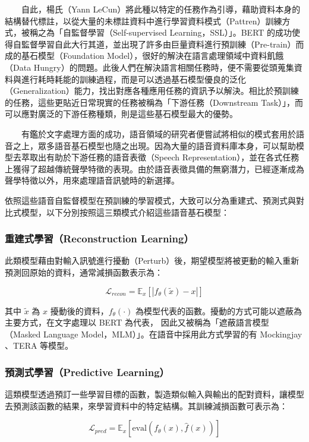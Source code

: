 　　自此，楊氏（Yann LeCun）將此種以特定的任務作為引導，藉助資料本身的結構替代標註，以從大量的未標註資料中進行學習資料模式（Pattren）訓練方式，被稱之為「自監督學習（Self-supervised Learning，SSL）」。BERT 的成功使得自監督學習自此大行其道，並出現了許多由巨量資料進行預訓練（Pre-train）而成的基石模型（Foundation Model），很好的解決在語言處理領域中資料飢餓（Data Hungry）的問題。此後人們在解決語言相關任務時，便不需要從頭蒐集資料與進行耗時耗能的訓練過程，而是可以透過基石模型優良的泛化（Generalization）能力，找出對應各種應用任務的資訊予以解決。相比於預訓練的任務，這些更貼近日常現實的任務被稱為「下游任務（Downstream Task）」，而可以應對廣泛的下游任務種類，則是這些基石模型最大的優勢。

　　有鑑於文字處理方面的成功，語音領域的研究者便嘗試將相似的模式套用於語音之上，眾多語音基石模型也隨之出現。因為大量的語音資料庫本身，可以幫助模型去萃取出有助於下游任務的語音表徵（Speech Representation），並在各式任務上獲得了超越傳統聲學特徵的表現。由於語音表徵具備的無窮潛力，已經逐漸成為聲學特徵以外，用來處理語音訊號時的新選擇。

依照這些語音自監督模型在預訓練的學習模式，大致可以分為重建式、預測式與對比式模型，以下分別按照這三類模式介紹這些語音基石模型：

\subsubsection{重建式學習（Reconstruction Learning）}

此類模型藉由對輸入訊號進行擾動（Perturb）後，期望模型將被更動的輸入重新預測回原始的資料，通常減損函數表示為：

$$\mathcal{L}_{recon} = \mathbb{E}_x[|f_\theta(\tilde{x}) - x|]$$

其中 $\tilde{x}$ 為 $x$ 擾動後的資料，$f_\theta(\cdot)$ 為模型代表的函數。擾動的方式可能以遮蔽為主要方式，在文字處理以 BERT 為代表， 因此又被稱為「遮蔽語言模型（Masked Language Model，MLM）」。在語音中採用此方式學習的有 Mockingjay \cite{liu_mockingjay_2019}、TERA \cite{t_tera_2021} 等模型。  %

\subsubsection{預測式學習（Predictive Learning）}

這類模型透過預訂一些學習目標的函數，製造類似輸入與輸出的配對資料，讓模型去預測該函數的結果，來學習資料中的特定結構。其訓練減損函數可表示為：

$$\mathcal{L}_{pred} = \mathbb{E}_x[\text{eval}(f_\theta(x), \hat{f}(x))]$$

